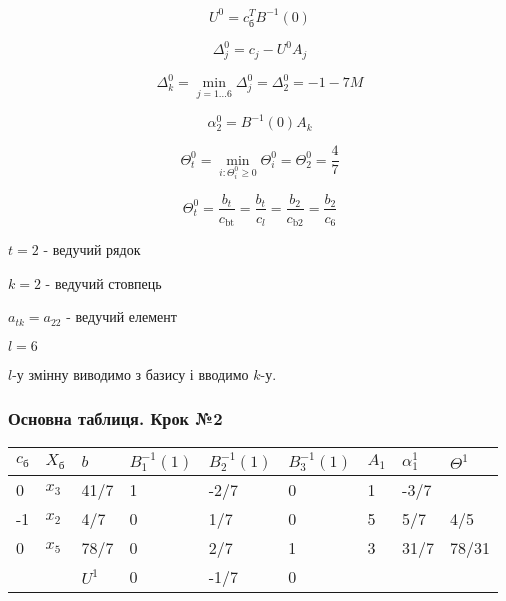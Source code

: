 \documentclass[a4paper, 12pt]{article}
\begin{document}
\begin{equation*}
	U^{0} = c_{\text{б}}^TB^{-1}(0)
\end{equation*}

\begin{equation*}
	\Delta_{j}^{0} = c_j - U^{0}A_{j}
\end{equation*}

\begin{equation*}
	\Delta_{k}^{0} = \min_{j=1 \dots 6} \Delta_{j}^{0} = \Delta_{2}^{0} = -1-7M
\end{equation*}

\begin{equation*}
	\alpha_{2}^{0} = B^{-1}(0)A_{k}
\end{equation*}

\begin{equation*}
	\Theta_t^{0} = \min_{i: \Theta_i^{0} \geqslant 0} \Theta_i^{0} = \Theta_2^{0} = \frac{4}{7}
\end{equation*}

\begin{equation*}
	\Theta_t^{0} = \frac{b_t}{c_\text{bt}} = \frac{b_t}{c_l} = \frac{b_2}{c_\text{b2}} = \frac{b_2}{c_\text{6}}
\end{equation*}

$t = 2$ - ведучий рядок

$k = 2$ - ведучий стовпець

$a_{tk} = a_{22}$ - ведучий елемент

$l = 6$

$l$-у змінну виводимо з базису і вводимо $k$-у.

\subsubsection{Основна таблиця. Крок №2}

\begin{table}[H]
    \centering
    \begin{tabular}{|l|l|l|l|l|l|l|l|l|}
    \hline
         $c_\text{б}$ & $X_\text{б}$ & $b$ & $B_{1}^{-1}(1)$ & $B_{2}^{-1}(1)$ & $B_{3}^{-1}(1)$ & $A_{1}$ & $\alpha_{1}^{1}$  & $\Theta^{1}$ \\ \hline
        0 & $x_3$ & 41/7 & 1 & -2/7 & 0 & 1 & -3/7 &  \\ \hline
        -1 & $x_2$ & 4/7 & 0 & 1/7 & 0 & 5 & 5/7 & 4/5 \\ \hline
        0 & $x_5$ & 78/7 & 0 & 2/7 & 1 & 3 & 31/7 & 78/31 \\ \hline
        & & $U^{1}$ & 0 & -1/7 & 0 & & &  \\ \hline
    \end{tabular}
\end{table}
\end{document}

